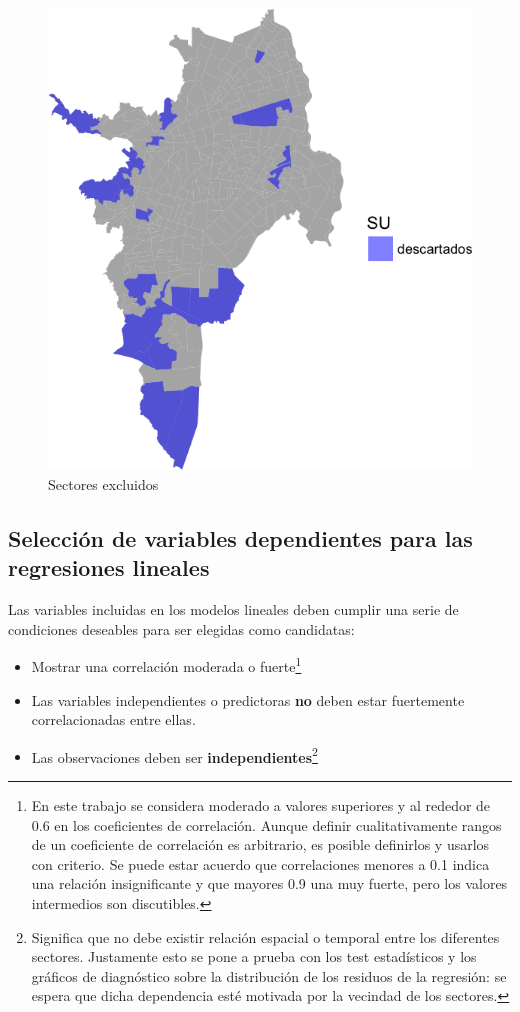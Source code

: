 \documentclass[12pt,a4paper,oneside, openany]{book}
\providecommand{\tightlist}{%
  \setlength{\itemsep}{0pt}\setlength{\parskip}{0pt}}
\let\rmarkdownfootnote\footnote%
\def\footnote{\protect\rmarkdownfootnote}
\theoremstyle{definition}
\theoremstyle{definition}
\theoremstyle{definition}
\theoremstyle{remark}
\begin{document}
\begin{figure}[H]

{\centering \includegraphics[width=0.6\linewidth]{tesis-unigis_files/figure-latex/mapa-excluidos-1} 

}

\caption{Sectores excluidos}\label{fig:mapa-excluidos}
\end{figure}

\subsection{Selección de variables dependientes para las regresiones
lineales}\label{selecciuxf3n-de-variables-dependientes-para-las-regresiones-lineales}

Las variables incluidas en los modelos lineales deben cumplir una serie
de condiciones deseables para ser elegidas como candidatas:

\begin{itemize}
\tightlist
\item
  Mostrar una correlación moderada o fuerte\footnote{En este trabajo se
    considera moderado a valores superiores y al rededor de 0.6 en los
    coeficientes de correlación. Aunque definir cualitativamente rangos
    de un coeficiente de correlación es arbitrario, es posible
    definirlos y usarlos con criterio. Se puede estar acuerdo que
    correlaciones menores a 0.1 indica una relación insignificante y que
    mayores 0.9 una muy fuerte, pero los valores intermedios son
    discutibles.}
\item
  Las variables independientes o predictoras \textbf{no} deben estar
  fuertemente correlacionadas entre ellas.
\item
  Las observaciones deben ser \textbf{independientes}\footnote{Significa
    que no debe existir relación espacial o temporal entre los
    diferentes sectores. Justamente esto se pone a prueba con los test
    estadísticos y los gráficos de diagnóstico sobre la distribución de
    los residuos de la regresión: se espera que dicha dependencia esté
    motivada por la vecindad de los sectores.}
\end{itemize}
\end{document}
